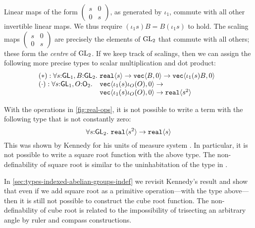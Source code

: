 Linear maps of the form $\left(
  \begin{smallmatrix}s & 0 \\ 0 & s\end{smallmatrix}\right)$, as
generated by $\iota_1$, commute with all other invertible linear
maps. We thus require
$(\iota_1 s)B = B(\iota_1 s)$ to hold.
The scaling maps $\left(
  \begin{smallmatrix}s & 0 \\ 0 & s\end{smallmatrix}\right)$
are precisely the elements of $\mathrm{GL}_2$ that commute with all others;
these form the \emph{centre} of $\mathrm{GL}_2$. If we keep track of
scalings, then we can assign the following more precise types to
scalar multiplication and dot product:
\begin{displaymath}
\begin{array}{@{}l@{}l}
  (*) : \forall s \mathord: \SynGL{1}, B \mathord:
  \SynGL{2}.\ & \tyPrim{real}{s} \to \tyPrim{vec}{B,0} \to
  \tyPrim{vec}{\iota_1(s)B,0}\\
    (\cdot) : \forall s \mathord: \SynGL{1}, O \mathord: \SynOrth{2}.\ & \tyPrim{vec}{\iota_1(s)\iota_O(O),0} \to\\
    &\tyPrim{vec}{\iota_1(s)\iota_O(O),0} \to \tyPrim{real}{s^2}
  \end{array}
\end{displaymath}

\begin{example}
  With the operations in \autoref{fig:real-ops}, it is not possible to
  write a term with the following type that is not constantly zero:
  \begin{displaymath}
    \forall s \mathord: \mathsf{GL}_2.\ \textup{\texttt{real}}\langle s^2 \rangle \to \textup{\texttt{real}}\langle s \rangle
  \end{displaymath}
  This was shown by Kennedy for his units of measure system
  \cite{kennedy97relational}.  In particular, it is not possible to
  write a square root function with the above type.  The
  non-definability of square root is similar to the uninhabitation of the
  type in .

  In \autoref{sec:types-indexed-abelian-groups-indef} we revisit
  Kennedy's result and show that even if we add square root as a
  primitive operation---with the type above---then it is still not
  possible to construct the cube root function. The non-definability of
  cube root is related to the impossibility of trisecting an arbitrary
  angle by ruler and compass constructions.
\end{example}



